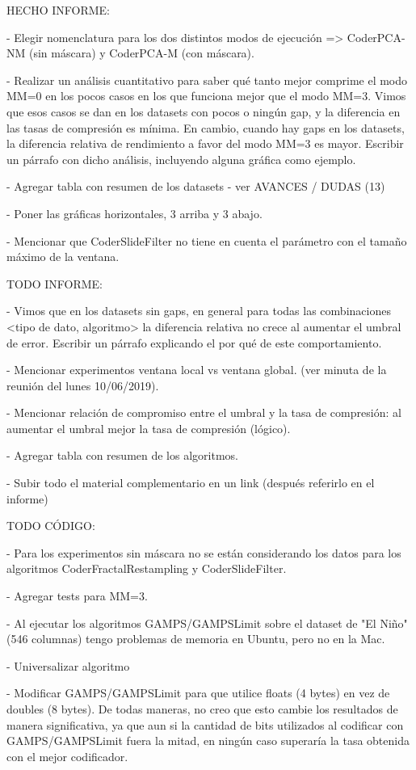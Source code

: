 \clearpage

HECHO INFORME:

- Elegir nomenclatura para los dos distintos modos de ejecución => CoderPCA-NM (sin máscara) y CoderPCA-M (con máscara).

- Realizar un análisis cuantitativo para saber qué tanto mejor comprime el modo MM=0 en los pocos casos en los que funciona mejor que el modo MM=3. Vimos que esos casos se dan en los datasets con pocos o ningún gap, y la diferencia en las tasas de compresión es mínima. En cambio, cuando hay gaps en los datasets, la diferencia relativa de rendimiento a favor del modo MM=3 es mayor. Escribir un párrafo con dicho análisis, incluyendo alguna gráfica como ejemplo.

- Agregar tabla con resumen de los datasets - ver AVANCES / DUDAS (13)

- Poner las gráficas horizontales, 3 arriba y 3 abajo.

- Mencionar que CoderSlideFilter no tiene en cuenta el parámetro con el tamaño máximo de la ventana.

\vspace{+20pt}

TODO INFORME:

- Vimos que en los datasets sin gaps, en general para todas las combinaciones <tipo de dato, algoritmo> la diferencia relativa no crece al aumentar el umbral de error. Escribir un párrafo explicando el por qué de este comportamiento.

- Mencionar experimentos ventana local vs ventana global. (ver minuta de la reunión del lunes 10/06/2019).

- Mencionar relación de compromiso entre el umbral y la tasa de compresión: al aumentar el umbral mejor la tasa de compresión (lógico).



- Agregar tabla con resumen de los algoritmos.

- Subir todo el material complementario en un link (después referirlo en el informe)

\clearpage

TODO CÓDIGO:

- Para los experimentos sin máscara no se están considerando los datos para los algoritmos CoderFractalRestampling y CoderSlideFilter.

- Agregar tests para MM=3.

- Al ejecutar los algoritmos GAMPS/GAMPSLimit sobre el dataset de "El Niño" (546 columnas) tengo problemas de memoria en Ubuntu, pero no en la Mac.

- Universalizar algoritmo

- Modificar GAMPS/GAMPSLimit para que utilice floats (4 bytes) en vez de doubles (8 bytes). De todas maneras, no creo que esto cambie los resultados de manera significativa, ya que aun si la cantidad de bits utilizados al codificar con GAMPS/GAMPSLimit fuera la mitad, en ningún caso superaría la tasa obtenida con el mejor codificador.